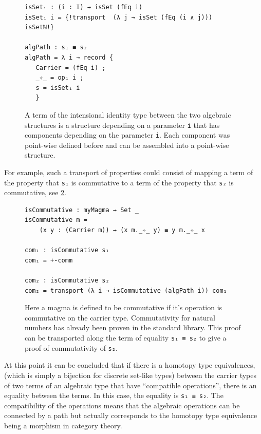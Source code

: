 \documentclass[12pt,a4paper,twoside,xetex]{book}
\begin{document}
\begin{figure}\label{algpath}
\centering
 \begin{BVerbatim}
isSetᵢ : (i : I) → isSet (fEq i)
isSetᵢ i = {!transport  (λ j → isSet (fEq (i ∧ j))) isSetℕ!} 

algPath : s₁ ≡ s₂
algPath = λ i → record {
   Carrier = (fEq i) ;
   _✧_ = opᵢ i ;
   s = isSetᵢ i
   }
 \end{BVerbatim}

 \caption{A term of the intensional identity type between the two algebraic 
structures is a structure depending on a parameter \texttt{i} that has 
components depending on the parameter \texttt{i}. Each component was point-wise 
defined before and can be assembled into a point-wise structure.}
\end{figure}



For example, such a transport of properties could consist of mapping a term of 
the property that \texttt{s₁} is commutative to a term of the property that 
\texttt{s₂} is commutative, see \cref{comtrans}.

\begin{figure}\label{comtrans}
\centering
\begin{BVerbatim}
isCommutative : myMagma → Set _
isCommutative m = 
    (x y : (Carrier m)) → (x m._✧_ y) ≡ y m._✧_ x

com₁ : isCommutative s₁
com₁ = +-comm

com₂ : isCommutative s₂
com₂ = transport (λ i → isCommutative (algPath i)) com₁
\end{BVerbatim}
\caption{Here a magma is defined to be commutative if it's operation is 
commutative on the carrier type. Commutativity for natural numbers has already 
been proven in the standard library. This proof can be transported along the 
term of equality \texttt{s₁ ≡ s₂} to give a proof of commutativity of 
\texttt{s₂}.}
\end{figure}


At this point it can be concluded that if there is a homotopy type 
equivalences, (which is simply a bijection for discrete set-like types) between 
the carrier types of two terms of an algebraic type that have ``compatible 
operations'', there is an equality between the terms. In this case, the 
equality is \texttt{s₁ ≡ s₂}. The compatibility of the operations means that 
the algebraic operations can be connected by a path but actually corresponds to 
the homotopy type equivalence being a morphism in category theory.
\end{document}
